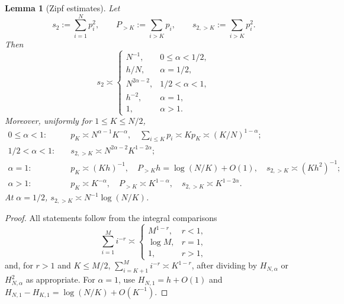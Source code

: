 \documentclass[11pt]{article}
\newtheorem{lemma}[lemma]{Lemma}
\theoremstyle{definition}
\begin{document}
\begin{lemma}[Zipf estimates]
\label{lem:zipf}
Let
\[
 s_2:=\sum_{i=1}^N p_i^2,
 \qquad
 P_{>K}:=\sum_{i>K}p_i,
 \qquad
 s_{2,>K}:=\sum_{i>K}p_i^2.
\]
Then
\begin{equation}
 s_2\asymp
 \begin{cases}
 N^{-1},&0\leq\alpha<1/2,\\
 h/N,&\alpha=1/2,\\
 N^{2\alpha-2},&1/2<\alpha<1,\\
 h^{-2},&\alpha=1,\\
 1,&\alpha>1.
 \end{cases}
 \label{eq:s2-orders}
\end{equation}
Moreover, uniformly for $1\leq K\leq N/2$,
\begin{align}
 0\leq\alpha<1:
 &\quad p_K\asymp N^{\alpha-1}K^{-\alpha},
 \quad \sum_{i\leq K}p_i\asymp Kp_K
 \asymp(K/N)^{1-\alpha};
 \label{eq:zipf-below-one}\\
 1/2<\alpha<1:
 &\quad s_{2,>K}\asymp N^{2\alpha-2}K^{1-2\alpha};
 \label{eq:zipf-tail-between}\\
 \alpha=1:
 &\quad p_K\asymp(Kh)^{-1},
 \quad P_{>K}h=\log(N/K)+O(1),
 \quad s_{2,>K}\asymp(Kh^2)^{-1};
 \label{eq:zipf-one}\\
 \alpha>1:
 &\quad p_K\asymp K^{-\alpha},
 \quad P_{>K}\asymp K^{1-\alpha},
 \quad s_{2,>K}\asymp K^{1-2\alpha}.
 \label{eq:zipf-above-one}
\end{align}
At $\alpha=1/2$,
$s_{2,>K}\asymp N^{-1}\log(N/K)$.
\end{lemma}

\begin{proof}
All statements follow from the integral comparisons
\[
 \sum_{i=1}^M i^{-r}\asymp
 \begin{cases}
 M^{1-r},&r<1,\\
 \log M,&r=1,\\
 1,&r>1,
 \end{cases}
\]
and, for $r>1$ and $K\leq M/2$,
$\sum_{i=K+1}^M i^{-r}\asymp K^{1-r}$, after dividing by
$H_{N,\alpha}$ or $H_{N,\alpha}^2$ as appropriate.  For
$\alpha=1$, use
$H_{N,1}=h+O(1)$ and
$H_{N,1}-H_{K,1}=\log(N/K)+O(K^{-1})$.
\end{proof}
\end{document}
